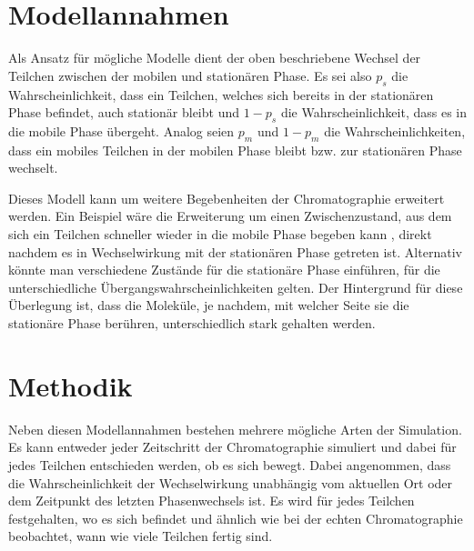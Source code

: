 \documentclass[a4paper,10pt]{article}
\begin{document}


\section{Modellannahmen}
Als Ansatz für mögliche Modelle dient der oben beschriebene Wechsel der Teilchen zwischen der mobilen und stationären Phase. 
Es sei also $p_s$ die Wahrscheinlichkeit, dass ein Teilchen, welches sich bereits in der stationären Phase befindet, auch stationär bleibt und $1-p_s$ die Wahrscheinlichkeit, dass es in die mobile Phase übergeht. Analog seien $p_m$ und $1-p_m$ die Wahrscheinlichkeiten, dass ein mobiles Teilchen in der mobilen Phase bleibt bzw. zur stationären Phase wechselt. 

Dieses Modell kann um weitere Begebenheiten der Chromatographie erweitert werden.
Ein Beispiel wäre die Erweiterung um einen Zwischenzustand, aus dem sich ein Teilchen schneller wieder in die mobile Phase begeben kann , direkt nachdem es in Wechselwirkung mit der stationären Phase getreten ist.
Alternativ könnte man verschiedene Zustände für die stationäre Phase einführen, für die unterschiedliche Übergangswahrscheinlichkeiten gelten. Der Hintergrund für diese Überlegung ist, dass die Moleküle, je nachdem, mit welcher Seite sie die stationäre Phase berühren, unterschiedlich stark gehalten werden. 


\section{Methodik}
Neben diesen Modellannahmen bestehen mehrere mögliche Arten der Simulation. Es kann entweder jeder Zeitschritt der Chromatographie simuliert und dabei für jedes Teilchen entschieden werden, ob es sich bewegt. Dabei angenommen, dass die Wahrscheinlichkeit der Wechselwirkung unabhängig vom aktuellen Ort oder dem Zeitpunkt des letzten Phasenwechsels ist. Es wird für jedes Teilchen festgehalten, wo es sich befindet und ähnlich wie bei der echten Chromatographie beobachtet, wann wie viele Teilchen fertig sind. 
\end{document}
